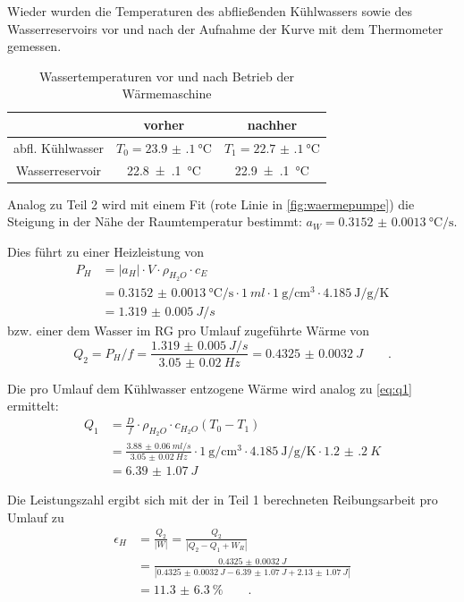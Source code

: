 Wieder wurden die Temperaturen des abfließenden Kühlwassers sowie des Wasserreservoirs vor und nach der Aufnahme der Kurve mit dem Thermometer gemessen.
\begin{table}[h!]
\centering
\begin{tabular}{c | c c}
		& vorher & nachher  \\ \midrule
		abfl. Kühlwasser & $T_0=\SI{23.9(1)}{\degreeCelsius}$ & $T_1=\SI{22.7(1)}{\degreeCelsius}$ \\
		Wasserreservoir & \SI{22.8(1)}{\degreeCelsius} & \SI{22.9(1)}{\degreeCelsius}
\end{tabular}
\caption{Wassertemperaturen vor und nach Betrieb der Wärmemaschine}
\label{tab:wassertemps_warm}
\end{table}

Analog zu Teil 2 wird mit einem Fit (rote Linie in \cref{fig:waermepumpe}) die Steigung in der Nähe der Raumtemperatur bestimmt: $a_W=\SI{0.3152(13)}{\degreeCelsius\per\s}$.

Dies führt zu einer Heizleistung von
\begin{align}
	P_H&=|a_H|\cdot V\cdot\rho_{H_2O}\cdot c_{E}\\
	&=\SI{0.3152(13)}{\degreeCelsius\per\s}\cdot \SI{1}{ml}\cdot\SI{1}{\g\per\cubic\cm}\cdot \SI{4.185}{\joule\per\gram\per\kelvin} \\
	&=\SI{1.319(5)}{J/s}
\label{eq:heizleistung}
\end{align}
bzw. einer dem Wasser im RG pro Umlauf zugeführte Wärme von 
\begin{equation}
	Q_2=P_H/f=\frac{\SI{1.319(5)}{J/s}}{\SI{3.05(2)}{Hz}}=\SI{0.4325(32)}{J} \qquad.
\label{eq:q2_H}
\end{equation}

Die pro Umlauf dem Kühlwasser entzogene Wärme wird analog zu \cref{eq:q1} ermittelt:
\begin{align}
	Q_1&=\frac{D}{f}\cdot \rho_{H_2O}\cdot c_{H_2O}(T_0-T_1) \\
	&=\frac{\SI{3.88(6)}{ml/s}}{\SI{3.05(2)}{Hz}}\cdot \SI{1}{\g\per\cubic\cm}\cdot \SI{4.185}{\joule\per\gram\per\kelvin}\cdot \SI{1.2(2)}{K} \\
	&=\SI{6.39(107)}{J}
\label{eq:q1_H}
\end{align}

Die Leistungszahl ergibt sich mit der in Teil 1 berechneten Reibungsarbeit pro Umlauf zu
\begin{align}
	\epsilon_H&=\frac{Q_2}{|W|}=\frac{Q_2}{|Q_2-Q_1+W_R|}\\
	&=\frac{\SI{0.4325(32)}{J}}{|\SI{0.4325(32)}{J}-\SI{6.39(107)}{J}+\SI{2.13(107)}{J}|}\\
	&=\SI{11.3(63)}{\percent}\qquad.
\label{eq:leistungheiss}
\end{align}

